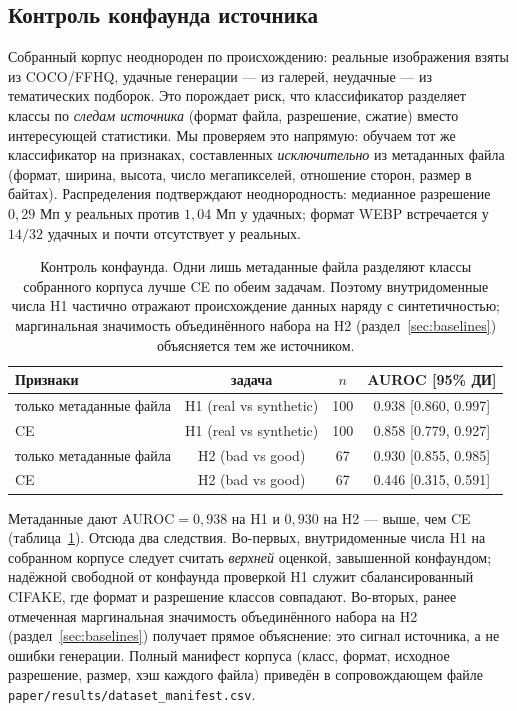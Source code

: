 \documentclass[14pt]{extarticle}
\theoremstyle{plain}
\numberwithin{equation}{section}
\numberwithin{figure}{section}
\numberwithin{table}{section}
\begin{document}
\subsection{Контроль конфаунда источника}\label{sec:confound}
Собранный корпус неоднороден по происхождению: реальные изображения взяты из
COCO/FFHQ, удачные генерации — из галерей, неудачные — из тематических подборок.
Это порождает риск, что классификатор разделяет классы по \emph{следам источника}
(формат файла, разрешение, сжатие) вместо интересующей статистики. Мы проверяем
это напрямую: обучаем тот же классификатор на признаках, составленных
\emph{исключительно} из метаданных файла (формат, ширина, высота, число
мегапикселей, отношение сторон, размер в байтах). Распределения подтверждают
неоднородность: медианное разрешение $0{,}29$ Мп у реальных против $1{,}04$ Мп у
удачных; формат WEBP встречается у $14/32$ удачных и почти отсутствует у реальных.

\begin{table}[h!]
\centering
\caption{Контроль конфаунда. Одни лишь метаданные файла разделяют классы
собранного корпуса лучше CE по обеим задачам. Поэтому внутридоменные числа H1
частично отражают происхождение данных наряду с синтетичностью; маргинальная
значимость объединённого набора на H2 (раздел~\ref{sec:baselines}) объясняется тем
же источником.}
\label{tab:confound}
\begin{tabular}{@{}lccc@{}}
\toprule
Признаки & задача & $n$ & AUROC [95\% ДИ] \\
\midrule
только метаданные файла & H1 (real vs synthetic) & 100 & 0.938 [0.860, 0.997] \\
CE                       & H1 (real vs synthetic) & 100 & 0.858 [0.779, 0.927] \\
только метаданные файла & H2 (bad vs good)       & 67  & 0.930 [0.855, 0.985] \\
CE                       & H2 (bad vs good)       & 67  & 0.446 [0.315, 0.591] \\
\bottomrule
\end{tabular}

\end{table}

Метаданные дают $\mathrm{AUROC}=0{,}938$ на H1 и $0{,}930$ на H2 — выше, чем CE
(таблица~\ref{tab:confound}). Отсюда два следствия. Во-первых, внутридоменные
числа H1 на собранном корпусе следует считать \emph{верхней} оценкой,
завышенной конфаундом; надёжной свободной от конфаунда проверкой H1 служит
сбалансированный CIFAKE, где формат и разрешение классов совпадают. Во-вторых,
ранее отмеченная маргинальная значимость объединённого набора на H2
(раздел~\ref{sec:baselines}) получает прямое объяснение: это сигнал источника, а
не ошибки генерации. Полный манифест корпуса (класс, формат, исходное разрешение,
размер, хэш каждого файла) приведён в сопровождающем файле
\texttt{paper/results/dataset\_manifest.csv}.
\end{document}
